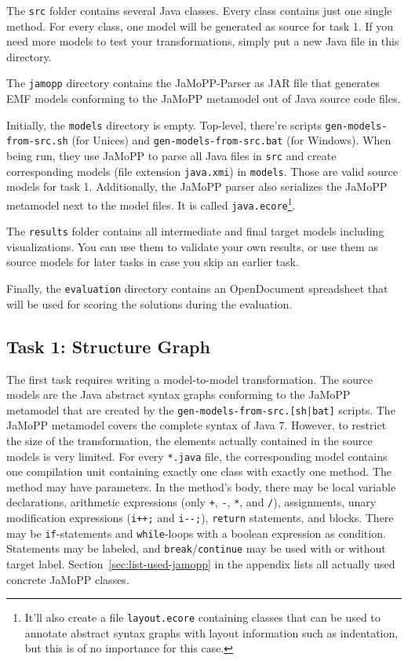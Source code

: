 \documentclass[11pt]{article}
\begin{document}
The \verb|src| folder contains several Java classes.  Every class contains just
one single method.  For every class, one model will be generated as source for
task 1.  If you need more models to test your transformations, simply put a new
Java file in this directory.

The \verb|jamopp| directory contains the JaMoPP-Parser as JAR file that
generates EMF models conforming to the JaMoPP metamodel out of Java source code
files.

Initially, the \verb|models| directory is empty.  Top-level, there're scripts
\verb|gen-models-from-src.sh| (for Unices) and \verb|gen-models-from-src.bat|
(for Windows).  When being run, they use JaMoPP to parse all Java files in
\verb|src| and create corresponding models (file extension \verb|java.xmi|) in
\verb|models|.  Those are valid source models for task 1.  Additionally, the
JaMoPP parser also serializes the JaMoPP metamodel next to the model files.  It
is called \verb|java.ecore|\footnote{It'll also create a file
  \texttt{layout.ecore} containing classes that can be used to annotate
  abstract syntax graphs with layout information such as indentation, but this
  is of no importance for this case.}.

The \verb|results| folder contains all intermediate and final target models
including visualizations.  You can use them to validate your own results, or
use them as source models for later tasks in case you skip an earlier task.

Finally, the \verb|evaluation| directory contains an OpenDocument spreadsheet
that will be used for scoring the solutions during the evaluation.


\subsection{Task 1: Structure Graph}
\label{sec:task1-structure-graph}

The first task requires writing a model-to-model transformation.  The source
models are the Java abstract syntax graphs conforming to the JaMoPP metamodel
that are created by the \verb$gen-models-from-src.[sh|bat]$ scripts.  The
JaMoPP metamodel covers the complete syntax of Java 7.  However, to restrict
the size of the transformation, the elements actually contained in the source
models is very limited.  For every \verb|*.java| file, the corresponding model
contains one compilation unit containing exactly one class with exactly one
method.  The method may have parameters.  In the method's body, there may be
local variable declarations, arithmetic expressions (only \verb|+|, \verb|-|,
\verb|*|, and \verb|/|), assignments, unary modification expressions
(\verb|i++;| and \verb|i--;|), \verb|return| statements, and blocks.  There may
be \verb|if|-statements and \verb|while|-loops with a boolean expression as
condition.  Statements may be labeled, and \verb|break|/\verb|continue| may be
used with or without target label.  Section~\ref{sec:list-used-jamopp} in the
appendix lists all actually used concrete JaMoPP classes.
\end{document}
